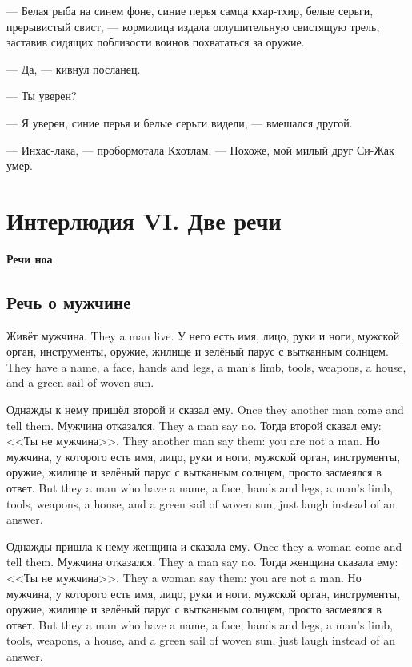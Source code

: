 --- Белая рыба на синем фоне, синие перья самца кхар-тхир, белые серьги, прерывистый свист, --- кормилица издала оглушительную свистящую трель, заставив сидящих поблизости воинов похвататься за оружие.

--- Да, --- кивнул посланец.

--- Ты уверен?

--- Я уверен, синие перья и белые серьги видели, --- вмешался другой.

--- Инхас-лака, --- пробормотала Кхотлам.
--- Похоже, мой милый друг Си-Жак умер.

\chapter*{Интерлюдия VI. Две речи}

\textbf{Речи ноа}

\section*{Речь о мужчине}

{Живёт мужчина.}
{They a man live.}
{У него есть имя, лицо, руки и ноги, мужской орган, инструменты, оружие, жилище и зелёный парус с вытканным солнцем.}
{They have a name, a face, hands and legs, a man's limb, tools, weapons, a house, and a green sail of woven sun.}

{Однажды к нему пришёл второй и сказал ему.}
{Once they another man come and tell them.}
{Мужчина отказался.}
{They a man say no.}
{Тогда второй сказал ему: <<Ты не мужчина>>.}
{They another man say them: you are not a man.}
{Но мужчина, у которого есть имя, лицо, руки и ноги, мужской орган, инструменты, оружие, жилище и зелёный парус с вытканным солнцем, просто засмеялся в ответ.}
{But they a man who have a name, a face, hands and legs, a man's limb, tools, weapons, a house, and a green sail of woven sun, just laugh instead of an answer.}

{Однажды пришла к нему женщина и сказала ему.}
{Once they a woman come and tell them.}
{Мужчина отказался.}
{They a man say no.}
{Тогда женщина сказала ему: <<Ты не мужчина>>.}
{They a woman say them: you are not a man.}
{Но мужчина, у которого есть имя, лицо, руки и ноги, мужской орган, инструменты, оружие, жилище и зелёный парус с вытканным солнцем, просто засмеялся в ответ.}
{But they a man who have a name, a face, hands and legs, a man's limb, tools, weapons, a house, and a green sail of woven sun, just laugh instead of an answer.}

